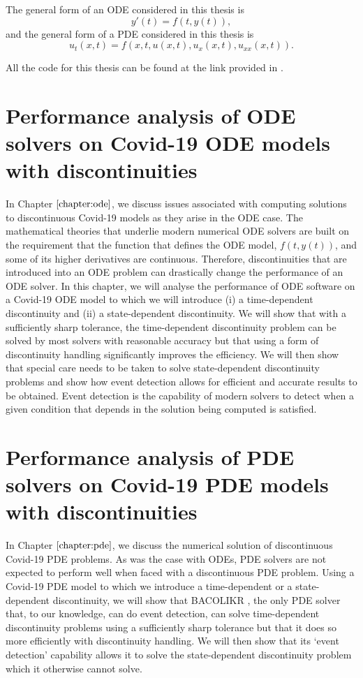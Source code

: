 \documentclass{report}
\begin{document}
The general form of an ODE considered in this thesis is 
\begin{equation}
y'(t) = f(t, y(t)),
\end{equation}
and the general form of a PDE considered in this thesis is 
\begin{equation}
u_t(x, t) = f(x, t, u(x,t), u_x(x,t), u_{xx}(x,t)).
\end{equation}

All the code for this thesis can be found at the link provided in \cite{thisThesisGithub}.

\section{Performance analysis of ODE solvers on Covid-19 ODE models with discontinuities}
In Chapter $\ref{chapter:ode}$, we discuss issues associated with computing solutions to discontinuous Covid-19 models as they arise in the ODE case. The mathematical theories that underlie modern numerical ODE solvers are built on the requirement that the function that defines the ODE model, $f(t, y(t))$, and some of its higher derivatives are continuous. Therefore, discontinuities that are introduced into an ODE problem can drastically change the performance of an ODE solver. In this chapter, we will analyse the performance of ODE software on a Covid-19 ODE model to which we will introduce (i) a time-dependent discontinuity and (ii) a state-dependent discontinuity. We will show that with a sufficiently sharp tolerance, the time-dependent discontinuity problem can be solved by most solvers with reasonable accuracy but that using a form of discontinuity handling significantly improves the efficiency. We will then show that special care needs to be taken to solve state-dependent discontinuity problems and show how event detection allows for efficient and accurate results to be obtained. Event detection is the capability of modern solvers to detect when a given condition that depends in the solution being computed is satisfied. 

\section{Performance analysis of PDE solvers on Covid-19 PDE models with discontinuities}
In Chapter $\ref{chapter:pde}$, we discuss the numerical solution of discontinuous Covid-19 PDE problems. As was the case with ODEs, PDE solvers are not expected to perform well when faced with a discontinuous PDE problem. Using a Covid-19 PDE model to which we introduce a time-dependent or a state-dependent discontinuity, we will show that BACOLIKR \cite{bacolikr}, the only PDE solver that, to our knowledge, can do event detection, can solve time-dependent discontinuity problems using a sufficiently sharp tolerance but that it does so more efficiently with discontinuity handling. We will then show that its `event detection' capability allows it to solve the state-dependent discontinuity problem which it otherwise cannot solve.
\end{document}
